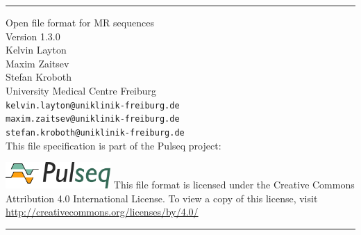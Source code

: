 \documentclass{article}
\date{}
\author{}
\def\myversionmajor{1}
\def\myversionminor{3}
\def\myversionrevision{0}
\def\myversion{\myversionmajor.\myversionminor.\myversionrevision }
\begin{document}
\begin{titlepage}
\begin{centering}
\rule{\textwidth}{5pt}\vskip1cm
\Huge{Open file format for MR sequences \\}
\vspace{1cm}
\LARGE{Version \myversion\\}
\vspace{1cm}
\large Kelvin Layton\\ Maxim Zaitsev\\ Stefan Kroboth\\
\vspace{1cm}
\large University Medical Centre Freiburg \\%
 \verb+kelvin.layton@uniklinik-freiburg.de+\\%
 \verb+maxim.zaitsev@uniklinik-freiburg.de+\\%
 \verb+stefan.kroboth@uniklinik-freiburg.de+\\%
 \vspace{1cm}
 This file specification is part of the Pulseq project:
 \vspace{0.5cm}

 \href{http://pulseq.github.io/}{\includegraphics[width=0.3\textwidth]{logo}}
 \vfill
\small This file format is licensed under the Creative Commons Attribution 4.0 International License. To view a copy of this license, visit \url{ http://creativecommons.org/licenses/by/4.0/ }\\
\rule{\textwidth}{5pt}
\end{centering}
\end{titlepage}

\newpage

\setlength\parindent{0pt}
\setlength{\parskip}{0.4\baselineskip}%

\tableofcontents

\setlength\parindent{0pt}
\setlength{\parskip}{\baselineskip}%

\newpage
\end{document}
